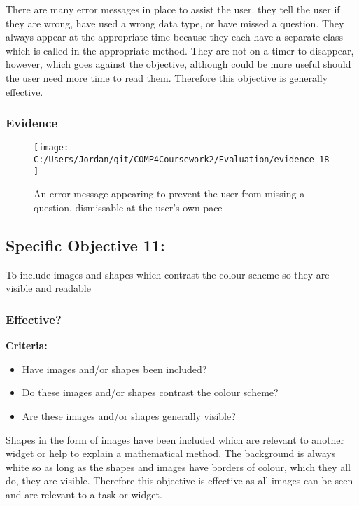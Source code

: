 There are many error messages in place to assist the user. they tell the user if they are wrong, have used a wrong data type, or have missed a question. They always appear at the appropriate time because they each have a separate class which is called in the appropriate method. They are not on a timer to disappear, however, which goes against the objective, although could be more useful should the user need more time to read them. Therefore this objective is generally effective.

\subsubsection{Evidence}

\begin{figure}[H]
	\texttt{[image: C:/Users/Jordan/git/COMP4Coursework2/Evaluation/evidence\_18]}
	\caption{An error message appearing to prevent the user from missing a question, dismissable at the user's own pace}
\end{figure}

\subsection{Specific Objective 11: }

To include images and shapes which contrast the colour scheme so they are visible and readable

\subsubsection{Effective?}

\textbf{Criteria: }

\begin{itemize}
	\item Have images and/or shapes been included?
	\item Do these images and/or shapes contrast the colour scheme?
	\item Are these images and/or shapes generally visible?
\end{itemize}

Shapes in the form of images have been included which are relevant to another widget or help to explain a mathematical method. The background is always white so as long as the shapes and images have borders of colour, which they all do, they are visible. Therefore this objective is effective as all images can be seen and are relevant to a task or widget.

